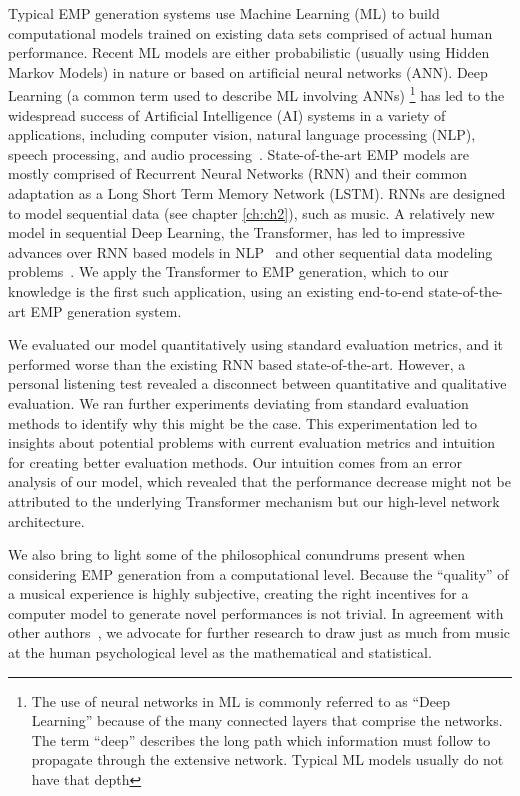 Typical EMP generation systems use Machine Learning (ML) to build computational models trained on existing data sets comprised of actual human performance. Recent ML models are either probabilistic (usually using Hidden Markov Models) in nature or based on artificial neural networks (ANN). Deep Learning (a common term used to describe ML involving ANNs)%
\footnote{The use of neural networks in ML is commonly referred to as ``Deep Learning'' because of the many connected layers that comprise the networks. The term ``deep'' describes the long path which information must follow to propagate through the extensive network. Typical ML models usually do not have that depth} has led to the widespread success of Artificial Intelligence (AI) systems in a variety of applications, including computer vision, natural language processing (NLP), speech processing, and audio processing~\cite{goodfellow2016deep}. State-of-the-art EMP models are mostly comprised of Recurrent Neural Networks (RNN) and their common adaptation as a Long Short Term Memory Network (LSTM). RNNs are designed to model sequential data (see chapter \ref{ch:ch2}), such as music. A relatively new model in sequential Deep Learning, the Transformer, has led to impressive advances over RNN based models in NLP~\cite{devlin2018bert,brown2020language} and other sequential data modeling problems~\cite{dosovitskiy2020image}. We apply the Transformer to EMP generation, which to our knowledge is the first such application, using an existing end-to-end state-of-the-art EMP generation system. 

We evaluated our model quantitatively using standard evaluation metrics, and it performed worse than the existing RNN based state-of-the-art. However, a personal listening test revealed a disconnect between quantitative and qualitative evaluation. We ran further experiments deviating from standard evaluation methods to identify why this might be the case. This experimentation led to insights about potential problems with current evaluation metrics and intuition for creating better evaluation methods. Our intuition comes from an error analysis of our model, which revealed that the performance decrease might not be attributed to the underlying Transformer mechanism but our high-level network architecture. 

We also bring to light some of the philosophical conundrums present when considering EMP generation from a computational level. Because the ``quality'' of a musical experience is highly subjective, creating the right incentives for a computer model to generate novel performances is not trivial. In agreement with other authors~\cite{widmer2016getting}, we advocate for further research to draw just as much from music at the human psychological level as the mathematical and statistical. 